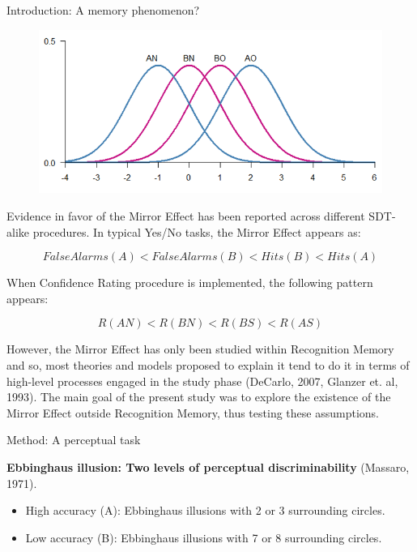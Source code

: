 \documentclass[final]{beamer}
\newlength{\onecolwid}
\begin{document}
\begin{frame}[t]
\begin{columns}[t]
\begin{column}{\onecolwid}
\begin{alertblock}{Introduction: A memory phenomenon?}
\begin{figure}
\includegraphics[width=0.5\linewidth]{Figures/MirrorEffect.png}
\end{figure}

Evidence in favor of the Mirror Effect has been reported across different SDT-alike procedures. In typical Yes/No tasks, the Mirror Effect appears as:

\begin{equation}
FalseAlarms(A) < FalseAlarms(B) < Hits(B) < Hits(A)
\label{eqn:Rates}
\end{equation}

When Confidence Rating procedure is implemented, the following pattern appears:

\begin{equation}
R(AN) < R(BN) < R(BS) < R(AS)
\label{eqn:Confidence}
\end{equation}

However, the Mirror Effect has only been studied within Recognition Memory and so, most theories and models proposed to explain it tend to do it in terms of high-level processes engaged in the study phase (DeCarlo, 2007, Glanzer et. al, 1993). The main goal of the present study was to explore the existence of the Mirror Effect outside Recognition Memory, thus testing these assumptions. 
\end{alertblock}



\begin{alertblock}{Method: A perceptual task}

\textbf{Ebbinghaus illusion: Two levels of perceptual discriminability} (Massaro, 1971).

\begin{itemize}
\item High accuracy (A): Ebbinghaus illusions with 2 or 3 surrounding circles.
\item Low accuracy (B): Ebbinghaus illusions with 7 or 8 surrounding circles.
\end{itemize}


\end{alertblock}
\end{column}
\end{columns}
\end{frame}
\end{document}
